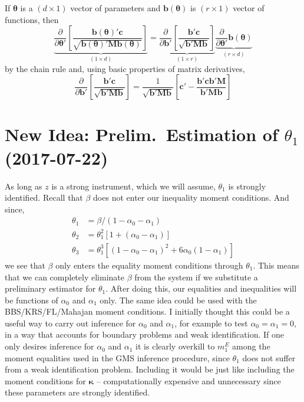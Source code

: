 \documentclass[12pt]{article}
\begin{document}
\noindent If $\boldsymbol{\theta}$ is a $(d\times 1)$ vector of parameters and $\mathbf{b}(\boldsymbol{\theta})$ is $(r\times 1)$ vector of functions, then 
\[
  \underbrace{\frac{\partial}{\partial \boldsymbol{\theta}'} \left[ \frac{\mathbf{b}(\boldsymbol{\theta})'\mathbf{c}}{\sqrt{\mathbf{b}(\boldsymbol{\theta})'\mathbf{M}\mathbf{b}(\boldsymbol{\theta})}} \right]}_{(1 \times d)}
  = \underbrace{\frac{\partial}{\partial \mathbf{b}'} \left[ \frac{\mathbf{b}'\mathbf{c}}{\sqrt{\mathbf{b}'\mathbf{M}\mathbf{b}}} \right]}_{(1\times r)} \underbrace{\frac{\partial}{\partial \boldsymbol{\theta}'} \mathbf{b}(\boldsymbol{\theta})}_{(r\times d)}
\]
by the chain rule and, using basic properties of matrix derivatives,
\[
  \frac{\partial}{\partial \mathbf{b}'} \left[ \frac{\mathbf{b}'\mathbf{c}}{\sqrt{\mathbf{b}'\mathbf{M}\mathbf{b}}}   \right] = \frac{1}{\sqrt{\mathbf{b}'\mathbf{M}\mathbf{b}}}\left[ \mathbf{c}' - \frac{\mathbf{b}' \mathbf{c}\mathbf{b}' \mathbf{M}}{\mathbf{b}'\mathbf{M}\mathbf{b}} \right]
\]

\section{New Idea: Prelim.\ Estimation of $\theta_1$ (2017-07-22)}
As long as $z$ is a strong instrument, which we will assume, $\theta_1$ is strongly identified.
Recall that $\beta$ does not enter our inequality moment conditions.
And since,
\begin{align*}
  \theta_1 &= \beta/(1 - \alpha_0 - \alpha_1)\\
  \theta_2 &= \theta_1^2 \left[ 1 + (\alpha_0 - \alpha_1) \right]\\
  \theta_3 &= \theta_1^3\left[ \left( 1 - \alpha_0 - \alpha_1 \right)^2 + 6\alpha_0\left( 1 - \alpha_1 \right) \right]
\end{align*}
we see that $\beta$ only enters the equality moment conditions through $\theta_1$.
This means that we can completely eliminate $\beta$ from the system if we substitute a preliminary estimator for $\theta_1$.
After doing this, our equalities and inequalities will be functions of $\alpha_0$ and $\alpha_1$ only.
The same idea could be used with the BBS/KRS/FL/Mahajan moment conditions.
I initially thought this could be a useful way to carry out inference for $\alpha_0$ and $\alpha_1$, for example to test $\alpha_0 = \alpha_1 = 0$, in a way that accounts for boundary problems and weak identification.
If one only desires inference for $\alpha_0$ and $\alpha_1$ it is clearly overkill to $m_1^E$ among the moment equalities used in the GMS inference procedure, since $\theta_1$ does not suffer from a weak identification problem.
Including it would be just like including the moment conditions for $\mathbf{\kappa}$ -- computationally expensive and unnecessary since these parameters are strongly identified.
\end{document}
